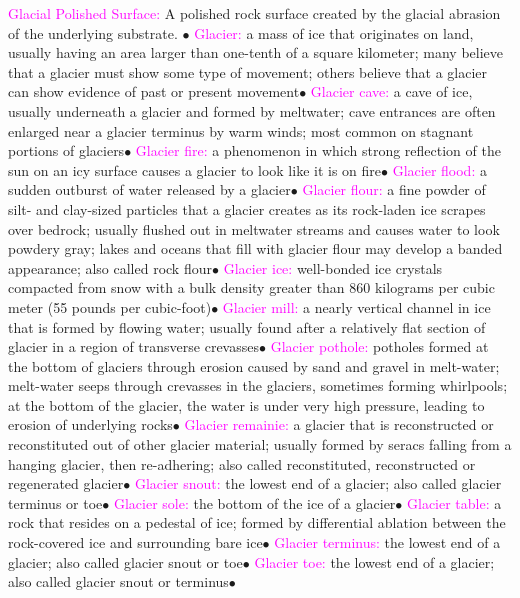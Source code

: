 \documentclass{article}
\newcommand{\ddd}{$\bullet$}
\newcommand{\pink}[1]{\textcolor{magenta}{#1}}
\newcommand{\vocab}[1]{{\pink{#1}}}
\begin{document}
\begin{multicols*}{4}
		\vocab{Glacial Polished Surface: } A polished rock surface created by the glacial abrasion of the underlying substrate. \ddd
		\vocab{        Glacier: } a mass of ice that originates on land, usually having an area larger than one-tenth of a square kilometer; many believe that a glacier must show some type of movement; others believe that a glacier can show evidence of past or present movement\ddd
		\vocab{        Glacier cave: } a cave of ice, usually underneath a glacier and formed by meltwater; cave entrances are often enlarged near a glacier terminus by warm winds; most common on stagnant portions of glaciers\ddd
		\vocab{        Glacier fire: } a phenomenon in which strong reflection of the sun on an icy surface causes a glacier to look like it is on fire\ddd
		\vocab{        Glacier flood: } a sudden outburst of water released by a glacier\ddd
		\vocab{        Glacier flour: } a fine powder of silt- and clay-sized particles that a glacier creates as its rock-laden ice scrapes over bedrock; usually flushed out in meltwater streams and causes water to look powdery gray; lakes and oceans that fill with glacier flour may develop a banded appearance; also called rock flour\ddd
		\vocab{        Glacier ice: } well-bonded ice crystals compacted from snow with a bulk density greater than 860 kilograms per cubic meter (55 pounds per cubic-foot)\ddd
		\vocab{        Glacier mill: } a nearly vertical channel in ice that is formed by flowing water; usually found after a relatively flat section of glacier in a region of transverse crevasses\ddd
		\vocab{        Glacier pothole: } potholes formed at the bottom of glaciers through erosion caused by sand and gravel in melt-water; melt-water seeps through crevasses in the glaciers, sometimes forming whirlpools; at the bottom of the glacier, the water is under very high pressure, leading to erosion of underlying rocks\ddd
		\vocab{        Glacier remainie: } a glacier that is reconstructed or reconstituted out of other glacier material; usually formed by seracs falling from a hanging glacier, then re-adhering; also called reconstituted, reconstructed or regenerated glacier\ddd
		\vocab{        Glacier snout: } the lowest end of a glacier; also called glacier terminus or toe\ddd
		\vocab{        Glacier sole: } the bottom of the ice of a glacier\ddd
		\vocab{        Glacier table: } a rock that resides on a pedestal of ice; formed by differential ablation between the rock-covered ice and surrounding bare ice\ddd
		\vocab{        Glacier terminus: } the lowest end of a glacier; also called glacier snout or toe\ddd
		\vocab{        Glacier toe: } the lowest end of a glacier; also called glacier snout or terminus\ddd

\end{multicols*}
\end{document}
